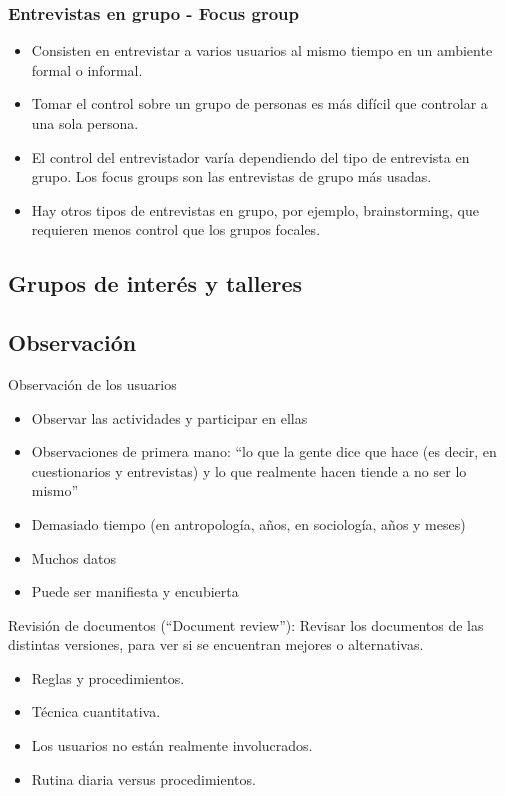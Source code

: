 \documentclass[12pt, twoside, openright]{report} %
\begin{document}
\subsubsection{Entrevistas en grupo - Focus group}

\begin{itemize}
	\item Consisten en entrevistar a varios usuarios al mismo tiempo en
	      un ambiente formal o informal.
	\item Tomar el control sobre un grupo de personas es más difícil que
	      controlar a una sola persona.
	\item El control del entrevistador varía dependiendo del tipo de
	      entrevista en grupo. Los focus groups son las entrevistas de
	      grupo más usadas.
	\item Hay otros tipos de entrevistas en grupo, por ejemplo,
	      brainstorming, que requieren menos control que los grupos
	      focales.
\end{itemize}
\subsection{Grupos de interés y talleres}
\subsection{Observación}

Observación de los usuarios

\begin{itemize}
	\item Observar las actividades y participar en ellas
	\item Observaciones de primera mano: ``lo que la gente dice que hace
	      (es decir, en cuestionarios y entrevistas) y lo que realmente
	      hacen tiende a no ser lo mismo''
	\item Demasiado tiempo (en antropología, años, en sociología, años y
	      meses)
	\item Muchos datos
	\item Puede ser manifiesta y encubierta
\end{itemize}

Revisión de documentos (``Document review''): Revisar los
documentos de las distintas versiones, para ver si se encuentran
mejores o alternativas.

\begin{itemize}
	\item Reglas y procedimientos.
	\item Técnica cuantitativa.
	\item Los usuarios no están realmente involucrados.
	\item Rutina diaria versus procedimientos.
\end{itemize}
\end{document}
